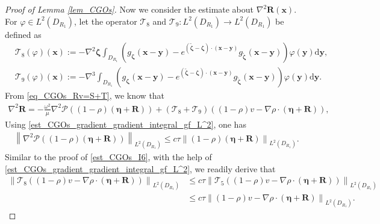 \documentclass[11pt,reqno,oneside]{amsart}
\theoremstyle{definition}
\theoremstyle{remark}
\numberwithin{equation}{section}
\numberwithin{equation}{section}
\theoremstyle{remark}
\begin{document}
\begin{proof}[Proof of Lemma \ref{lem_CGOs}]
	Now we consider the estimate about $ \nabla^2 \mathbf{R}\left(\mathbf{x}\right) $. For $ \varphi \in L^2 \left(D_{R_1}\right) $, let the operator $ \mathcal{T}_8 $ and $ \mathcal{T}_9 : L^2\left(D_{R_1}\right)\to L^2\left(D_{R_1}\right) $ be defined as
	\begin{align*}
		&\mathcal{T}_8\left(\varphi\right)\left(\mathbf{x}\right) := - \nabla^2 \bm{\zeta} \int_{D_{R_1}} \left(g_{\bm{\zeta}}\left(\mathbf{x} - \mathbf{y}\right) - e^{\left(\tilde{\bm{\zeta}}-\bm{\zeta}\right) \cdot \left(\mathbf{x} - \mathbf{y}\right)} g_{\tilde{\bm{\zeta}}}\left(\mathbf{x} - \mathbf{y}\right)\right) \varphi\left(\mathbf{y}\right) \mathrm{d} \mathbf{y}, \\
		&\mathcal{T}_9\left(\varphi\right)\left(\mathbf{x}\right) := - \nabla^3 \int_{D_{R_1}} \left(g_{\bm{\zeta}}\left(\mathbf{x} - \mathbf{y}\right) - e^{\left(\tilde{\bm{\zeta}}-\bm{\zeta}\right) \cdot \left(\mathbf{x} - \mathbf{y}\right)} g_{\tilde{\bm{\zeta}}}\left(\mathbf{x} - \mathbf{y}\right)\right) \varphi\left(\mathbf{y}\right) \mathrm{d} \mathbf{y}.
	\end{align*}
	From \eqref{eq_CGOs_Rv=S+T}, we know that 
	\begin{align*}
		\nabla^2\mathbf{R} = -\frac{\omega^2}{\mu} \nabla^2\mathcal{P}\left(\left(1-\rho\right) \left(\bm{\eta}+\mathbf{R}\right)\right) + \left(\mathcal{T}_8 + \mathcal{T}_9\right) \left(\left(1-\rho\right) v - \nabla \rho \cdot \left(\bm{\eta}+\mathbf{R}\right)\right),
	\end{align*}
	Using \eqref{est_CGOs_gradient_gradient_integral_gf_L^2}, one has
	\begin{align*} 
		\left\| \nabla^2\mathcal{P}\left(\left(1-\rho\right) \left(\bm{\eta}+\mathbf{R}\right)\right) \right\|_{L^2\left(D_{R_1}\right)} \leqslant c \tau \left\| \left(1-\rho\right) \left(\bm{\eta}+\mathbf{R}\right) \right\|_{L^2\left(D_{R_1}\right)} .
	\end{align*}
	Similar to the proof of \eqref{est_CGOs_I6}, with the help of \eqref{est_CGOs_gradient_gradient_integral_gf_L^2}, we readily derive that
	\begin{align*} 
		\left\| \mathcal{T}_8 \left(\left(1-\rho\right) v - \nabla \rho \cdot \left(\bm{\eta}+\mathbf{R}\right)\right) \right\|_{L^2\left(D_{R_1}\right)} &\leqslant c \tau \left\| \mathcal{T}_5 \left(\left(1-\rho\right) v - \nabla \rho \cdot \left(\bm{\eta}+\mathbf{R}\right)\right) \right\|_{L^2\left(D_{R_1}\right)} \\
		&\leqslant c \tau \left\| \left(1-\rho\right) v - \nabla \rho \cdot \left(\bm{\eta}+\mathbf{R}\right) \right\|_{L^2\left(D_{R_1}\right)} .

\end{align*}
\end{proof}
\end{document}

